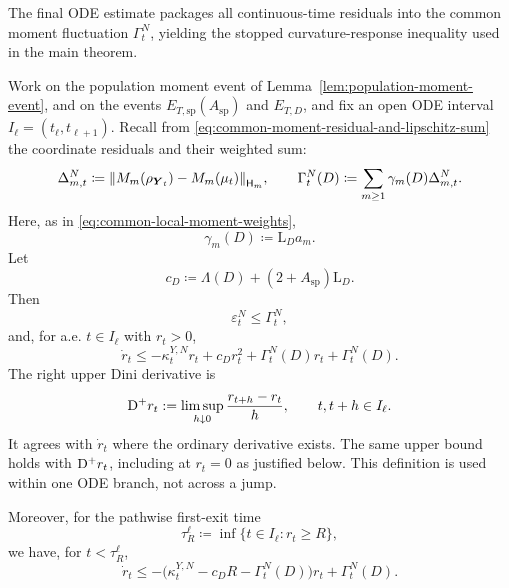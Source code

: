 The final ODE estimate packages all continuous-time residuals into the common moment fluctuation \(\Gamma_t^N\), yielding the stopped curvature-response inequality used in the main theorem.

\begin{lemma}
\label{lemma-common-empirical-moment-residual-directional-rt}
Work on the population moment event of Lemma~\ref{lem:population-moment-event}, and on the events
$E_{T,\mathrm{sp}}(A_{\mathrm{sp}})$ and $E_{T,D}$, and fix an open ODE interval
\(I_\ell=(t_\ell,t_{\ell+1})\). Recall from
\cref{eq:common-moment-residual-and-lipschitz-sum} the coordinate residuals
and their weighted sum:
\begin{equation}
    \Delta_{m,t}^N
    \coloneq
    \norm{M_m(\rho_{\boldsymbol{Y}_t})-M_m(\mu_t)}_{\mathsf H_m},
    \qquad
    \Gamma_t^N(D)
    \coloneq
    \sum_{m\ge1}\gamma_m(D)\Delta_{m,t}^N.
\end{equation}
Here, as in \cref{eq:common-local-moment-weights},
\begin{equation}
    \gamma_m(D)
    \coloneq
    \mathrm L_Da_m.
\end{equation}
Let
\begin{equation}
\label{eq-Csp-definition}
    c_D
    \coloneq
    \Lambda(D)+(2+A_{\mathrm{sp}})\mathrm L_D.
\end{equation}
Then
\begin{equation}
    \varepsilon_t^N\le \Gamma_t^N,
\end{equation}
and, for a.e. \(t\in I_\ell\) with \(r_t>0\),
\begin{equation}
\label{eq-rt-directional-final}
    \dot r_t
    \le
    -\kappa_t^{Y,N}r_t
    +
    c_Dr_t^2
    +
    \Gamma_t^N(D)r_t
    +
    \Gamma_t^N(D).
\end{equation}
The right upper Dini derivative is
\begin{equation}
\label{eq:right-upper-dini-derivative}
 \mathrm{D}^+r_t:=\limsup_{h\downarrow0}\frac{r_{t+h}-r_t}{h},
 \qquad t,t+h\in I_\ell.
\end{equation}
It agrees with $\dot r_t$ where the ordinary derivative exists.
The same upper bound holds with $\mathrm{D}^+r_t$, including at $r_t=0$
as justified below. This definition is used within one ODE branch,
not across a jump.

Moreover, for the pathwise first-exit time
\begin{equation}
    \tau_R^\ell
    \coloneq
    \inf\{t\in I_\ell:r_t\ge R\},
\end{equation}
we have, for \(t<\tau_R^\ell\),
\begin{equation}
\label{eq-rt-directional-stopped}
    \dot r_t
    \le
    -\bigl(\kappa_t^{Y,N}-c_DR-\Gamma_t^N(D)\bigr)r_t
    +
    \Gamma_t^N(D).
\end{equation}
\end{lemma}

